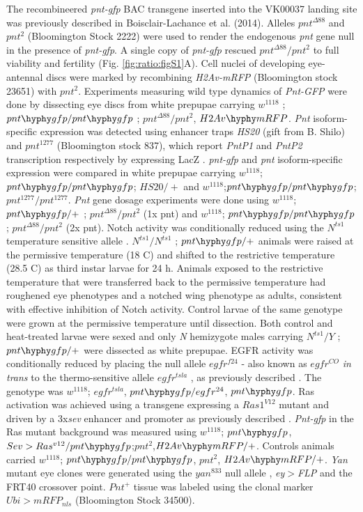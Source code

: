 The recombineered \textit{pnt-gfp} BAC transgene inserted into the VK00037 landing site was previously described in Boisclair-Lachance et al. (2014). Alleles $pnt^{\Delta 88}$ \cite{ONeill1994a} and $pnt^2$ (Bloomington Stock 2222) were used to render the endogenous \textit{pnt} gene null in the presence of \textit{pnt-gfp}. A single copy of \textit{pnt-gfp} rescued $pnt^{\Delta 88}/pnt^2$ to full viability and fertility (Fig. \ref{fig:ratio:figS1}A). Cell nuclei of developing eye-antennal discs were marked by recombining \textit{H2Av-mRFP} (Bloomington stock 23651) with $pnt^2$. Experiments measuring wild type dynamics of \textit{Pnt-GFP} were done by dissecting eye discs from white prepupae carrying $w^{1118}$ ; $pnt\hyphy gfp / pnt\hyphy gfp$ ; $pnt^{\Delta 88}/pnt^2$, $H2Av\hyphy mRFP$. \textit{Pnt} isoform-specific expression was detected using enhancer traps \textit{HS20} (gift from B. Shilo) and $pnt^{1277}$ (Bloomington stock 837), which report \textit{PntP1} and \textit{PntP2} transcription respectively by expressing LacZ \cite{Scholz1993}. \textit{pnt-gfp} and \textit{pnt} isoform-specific expression were compared in white prepupae carrying $w^{1118}$; $pnt\hyphy gfp/pnt\hyphy gfp$; $HS20/+$ and $w^{1118}$;$pnt\hyphy gfp/pnt\hyphy gfp$; $pnt^{1277}/pnt^{1277}$. \textit{Pnt} gene dosage experiments were done using $w^{1118}$; $pnt\hyphy gfp/+$ ; $pnt^{\Delta 88}/pnt^2$ (1x pnt) and $w^{1118}$; $pnt\hyphy gfp/pnt\hyphy gfp$ ; $pnt^{\Delta 88}/pnt^2$ (2x pnt). Notch activity was conditionally reduced using the $N^{ts1}$ temperature sensitive allele \cite{Shellenbarger1975}. $N^{ts1}/N^{ts1}$ ; $pnt\hyphy gfp/+$ animals were raised at the permissive temperature (18 \textdegree{}C) and shifted to the restrictive temperature (28.5 \textdegree{}C) as third instar larvae for 24 h. Animals exposed to the restrictive temperature that were transferred back to the permissive temperature had roughened eye phenotypes and a notched wing phenotype as adults, consistent with effective inhibition of Notch activity. Control larvae of the same genotype were grown at the permissive temperature until dissection. Both control and heat-treated larvae were sexed and only \textit{N} hemizygote males carrying $N^{ts1}/Y$ ; $pnt\hyphy gfp/+$ were dissected as white prepupae. EGFR activity was conditionally reduced by placing the null allele $egfr^{f24}$ - also known as $egfr^{CO}$ \cite{Clifford1989} \textit{in trans} to the thermo-sensitive allele $egfr^{tsla}$ \cite{Kumar1998}, as previously described \cite{Pelaez2015a}. The genotype was $w^{1118}$; $egfr^{tsla}$, $pnt\hyphy gfp/egfr^{24}$, $pnt\hyphy gfp$. Ras activation was achieved using a transgene expressing a $Ras1^{V12}$ mutant and driven by a 3x\textit{sev} enhancer and promoter \cite{Fortini1992} as previously described \cite{Pelaez2015a}. \textit{Pnt-gfp} in the Ras mutant background was measured using $w^{1118}$; $pnt\hyphy gfp$, $Sev>Ras^{v12}/pnt\hyphy gfp$;$pnt^2$,$H2Av\hyphy mRFP/+$. Controls animals carried $w^{1118}$; $pnt\hyphy gfp/pnt\hyphy gfp$, $pnt^2$, $H2Av\hyphy mRFP/+$. \textit{Yan} mutant eye clones were generated using the $yan^{833}$ null allele \cite{Webber2013}, \textit{ey$>$FLP} and the FRT40 crossover point. $Pnt^+$ tissue was labeled using the clonal marker $Ubi>mRFP_{nls}$ (Bloomington Stock 34500). 